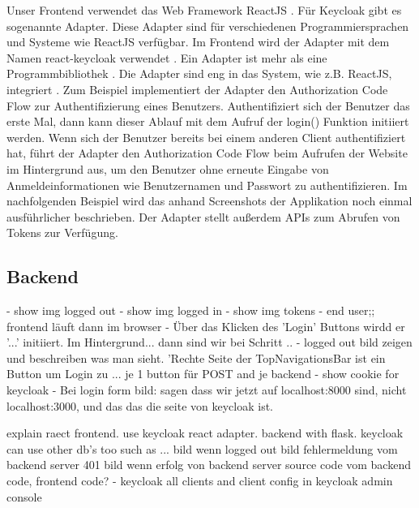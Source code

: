 Unser Frontend verwendet das Web Framework ReactJS \cite{EB43}. Für Keycloak gibt es sogenannte Adapter. Diese Adapter sind für verschiedenen Programmiersprachen und Systeme wie ReactJS verfügbar. Im Frontend wird der Adapter mit dem Namen react-keycloak verwendet \cite{EB36}. Ein Adapter ist mehr als eine Programmbibliothek \cite{EB43}. Die Adapter sind eng in das System, wie z.B. ReactJS, integriert \cite{EB43}. Zum Beispiel implementiert der Adapter den Authorization Code Flow zur Authentifizierung eines Benutzers. Authentifiziert sich der Benutzer das erste Mal, dann kann dieser Ablauf mit dem Aufruf der login() Funktion initiiert werden. Wenn sich der Benutzer bereits bei einem anderen Client authentifiziert hat, führt der Adapter den Authorization Code Flow beim Aufrufen der Website im Hintergrund aus, um den Benutzer ohne erneute Eingabe von Anmeldeinformationen wie Benutzernamen und Passwort zu authentifizieren. Im nachfolgenden Beispiel wird das anhand Screenshots der Applikation noch einmal ausführlicher beschrieben. Der Adapter stellt außerdem APIs zum Abrufen von Tokens zur Verfügung.

\subsection{Backend}





- show img logged out
- show img logged in
- show img tokens
- end user;; frontend läuft dann im browser
- Über das Klicken des 'Login' Buttons wirdd er '...' initiiert. Im Hintergrund... dann sind wir bei Schritt ..
- logged out bild zeigen und beschreiben was man sieht. 'Rechte Seite der TopNavigationsBar ist ein Button um Login zu ... je 1 button für POST and je backend
- show cookie for keycloak
- Bei login form bild: sagen dass wir jetzt auf localhost:8000 sind, nicht localhost:3000, und das das die seite von keycloak ist.


explain raect frontend. use keycloak react adapter. backend with flask. keycloak can use other db's too such as ...
bild wenn logged out
bild fehlermeldung vom backend server 401
bild wenn erfolg von backend server
source code vom backend code, frontend code?
- keycloak all clients and client config in keycloak admin console

